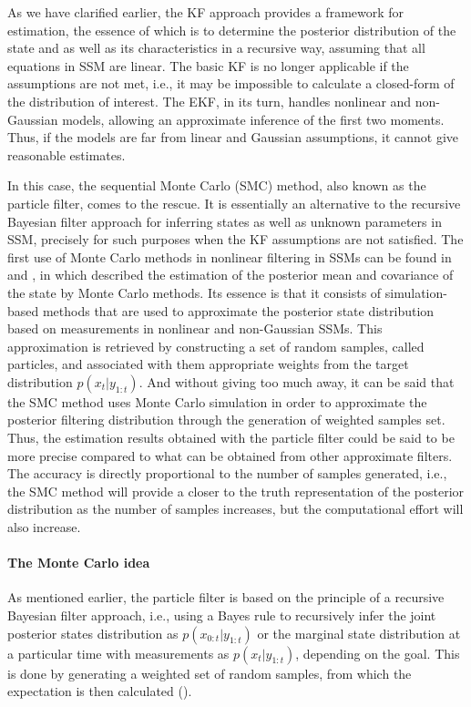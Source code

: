 As we have clarified earlier, the KF approach provides a framework for estimation, the essence of which is to determine the posterior distribution of the state and as well as its characteristics in a recursive way, assuming that all equations in SSM are linear. The basic KF is no longer applicable if the assumptions are not met, i.e., it may be impossible to calculate a closed-form of the distribution of interest. The EKF, in its turn, handles nonlinear and non-Gaussian models, allowing an approximate inference of the first two moments. Thus, if the models are far from linear and Gaussian assumptions, it cannot give reasonable estimates.

In this case, the sequential Monte Carlo (SMC) method, also known as the particle filter, comes to the rescue. It is essentially an alternative to the recursive Bayesian filter approach for inferring states as well as unknown parameters in SSM, precisely for such purposes when the KF assumptions are not satisfied. The first use of Monte Carlo methods in nonlinear filtering in SSMs can be found in \cite{handschin_monte_1969} and \cite{Handschin1970MonteCT}, in which described the estimation of the posterior mean and covariance of the state by Monte Carlo methods. Its essence is that it consists of simulation-based methods that are used to approximate the posterior state distribution based on measurements in nonlinear and non-Gaussian SSMs. This approximation is retrieved by constructing a set of random samples, called particles, and associated with them appropriate weights from the target distribution \(p(x_t|y_{1:t})\). And without giving too much away, it can be said that the SMC method uses Monte Carlo simulation in order to approximate the posterior filtering distribution through the generation of weighted samples set. Thus, the estimation results obtained with the particle filter could be said to be more precise compared to what can be obtained from other approximate filters. The accuracy is directly proportional to the number of samples generated, i.e., the SMC method will provide a closer to the truth representation of the posterior distribution as the number of samples increases, but the computational effort will also increase.

\paragraph*{The Monte Carlo idea}
As mentioned earlier, the particle filter is based on the principle of a recursive Bayesian filter approach, i.e., using a Bayes rule to recursively infer the joint posterior states distribution as \(p(x_{0:t}|y_{1:t})\) or the marginal state distribution at a particular time with measurements as \(p(x_t|y_{1:t})\), depending on the goal. This is done by generating a weighted set of random samples, from which the expectation is then calculated (\cite[page~197–208]{doucet_sequential_2001}).

